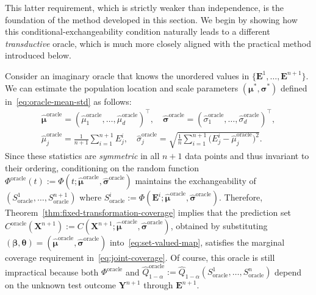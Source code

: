 This latter requirement, which is strictly weaker than independence, is the foundation of the method developed in this section.
We begin by showing how this conditional-exchangeability condition naturally leads to a different \emph{transductive} oracle, which is much more closely aligned with the practical method introduced below.

{\color{blue}
Consider an imaginary oracle that knows the unordered values in $\{\mathbf{E}^1,\ldots,\mathbf{E}^{n+1}\}$. We can estimate the population location and scale parameters $(\boldsymbol \mu^*, \boldsymbol\sigma^*)$ defined in~\eqref{eq:oracle-mean-std} as follows:
\begin{equation} \label{eq:transductive-oracle-mean-std}
\begin{aligned}
\boldsymbol{\hat{\mu}}^{\mathrm{oracle}} = (\hat{\mu}^{\mathrm{oracle}}_1,\ldots,\hat{\mu}^{\mathrm{oracle}}_d)^\top,
\quad
\boldsymbol{\hat{\sigma}}^{\mathrm{oracle}} = (\hat{\sigma}^{\mathrm{oracle}}_1,\ldots,\hat{\sigma}^{\mathrm{oracle}}_d)^\top,\\
\hat{\mu}^{\mathrm{oracle}}_j  = \frac{1}{n+1} \sum_{i=1}^{n+1} {E}^i_j,
\quad
\hat{\sigma}^{\mathrm{oracle}}_j 
= \sqrt{\frac{1}{n} \sum_{i=1}^{n+1} \!\bigl({E}^i_j - \hat{\mu}^{\mathrm{oracle}}_j\bigr)^2}.
\end{aligned}
\end{equation}
Since these statistics are \emph{symmetric} in all $n+1$ data points and thus invariant to their ordering, conditioning on the random function $\Phi^\mathrm{oracle}(t):=\Phi(t; \boldsymbol{\hat{\mu}}^{\mathrm{oracle}}, \boldsymbol{\hat{\sigma}}^{\mathrm{oracle}} )$ maintains the exchangeability of $(S^1_{\mathrm{oracle}},\ldots,S^{n+1}_{\mathrm{oracle}})$ where $S^i_{\mathrm{oracle}}:= \Phi(\mathbf{E}^i; \boldsymbol{\hat{\mu}}^{\mathrm{oracle}}, \boldsymbol{\hat{\sigma}}^{\mathrm{oracle}})$. Therefore, Theorem~\ref{thm:fixed-transformation-coverage} implies that the prediction set ${C}^{\mathrm{oracle}}(\mathbf{X}^{n+1}):= C(\mathbf{X}^{n+1};\hat{\boldsymbol\mu}^{\mathrm{oracle}}, \hat{\boldsymbol\sigma}^{\mathrm{oracle}})$, obtained by substituting $(\boldsymbol \beta, \boldsymbol \theta) = (\hat{\boldsymbol\mu}^{\mathrm{oracle}}, \hat{\boldsymbol\sigma}^{\mathrm{oracle}})$ into~\eqref{eq:set-valued-map}, satisfies the marginal coverage requirement in~\eqref{eq:joint-coverage}.
Of course, this oracle is still impractical because both $\Phi^\mathrm{oracle}$ and $\hat{Q}^{\mathrm{oracle}}_{1-\alpha}:= \hat{Q}_{1-\alpha}(S^1_{\mathrm{oracle}},\ldots,S^n_{\mathrm{oracle}})$ depend on the unknown test outcome $\mathbf{Y}^{n+1}$ through $\mathbf{E}^{n+1}$. 

}
